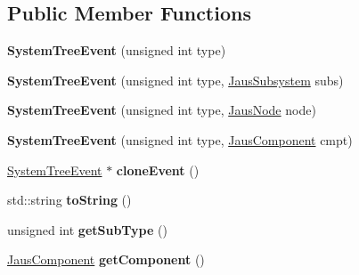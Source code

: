 \subsection*{\-Public \-Member \-Functions}
\begin{DoxyCompactItemize}
\item 
\hypertarget{class_system_tree_event_a5f4da63f42f00cd80cbc4f2a7bb86715}{{\bfseries \-System\-Tree\-Event} (unsigned int type)}\label{class_system_tree_event_a5f4da63f42f00cd80cbc4f2a7bb86715}

\item 
\hypertarget{class_system_tree_event_aabd7f07b108797c8e8b48f82bf98211e}{{\bfseries \-System\-Tree\-Event} (unsigned int type, \hyperlink{struct_jaus_subsystem_struct}{\-Jaus\-Subsystem} subs)}\label{class_system_tree_event_aabd7f07b108797c8e8b48f82bf98211e}

\item 
\hypertarget{class_system_tree_event_aa750263d05a83f8a790a67db75958cf8}{{\bfseries \-System\-Tree\-Event} (unsigned int type, \hyperlink{struct_jaus_node_struct}{\-Jaus\-Node} node)}\label{class_system_tree_event_aa750263d05a83f8a790a67db75958cf8}

\item 
\hypertarget{class_system_tree_event_ae7fa33da30f5878adb2aff75b9368a7f}{{\bfseries \-System\-Tree\-Event} (unsigned int type, \hyperlink{struct_jaus_component_struct}{\-Jaus\-Component} cmpt)}\label{class_system_tree_event_ae7fa33da30f5878adb2aff75b9368a7f}

\item 
\hypertarget{class_system_tree_event_a07f07cf432af5d82e0a9fa9cc5848047}{\hyperlink{class_system_tree_event}{\-System\-Tree\-Event} $\ast$ {\bfseries clone\-Event} ()}\label{class_system_tree_event_a07f07cf432af5d82e0a9fa9cc5848047}

\item 
\hypertarget{class_system_tree_event_aa136f57907b20b40225f5ab6f413bb9f}{std\-::string {\bfseries to\-String} ()}\label{class_system_tree_event_aa136f57907b20b40225f5ab6f413bb9f}

\item 
\hypertarget{class_system_tree_event_a94d723726ee4201af6c74e9be394ac12}{unsigned int {\bfseries get\-Sub\-Type} ()}\label{class_system_tree_event_a94d723726ee4201af6c74e9be394ac12}

\item 
\hypertarget{class_system_tree_event_a7aa20bb527490c9a887d7d2fa4b425a6}{\hyperlink{struct_jaus_component_struct}{\-Jaus\-Component} {\bfseries get\-Component} ()}\label{class_system_tree_event_a7aa20bb527490c9a887d7d2fa4b425a6}


\end{DoxyCompactItemize}
